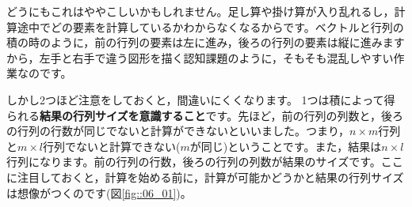 \documentclass{ltjsbook}
\begin{document}
どうにもこれはややこしいかもしれません。足し算や掛け算が入り乱れるし，計算途中でどの要素を計算しているかわからなくなるからです。ベクトルと行列の積の時のように，前の行列の要素は左に進み，後ろの行列の要素は縦に進みますから，左手と右手で違う図形を描く認知課題のように，そもそも混乱しやすい作業なのです。

しかし2つほど注意をしておくと，間違いにくくなります。
1つは積によって得られる\textbf{結果の行列サイズを意識すること}です。先ほど，前の行列の列数と，後ろの行列の行数が同じでないと計算ができないといいました。つまり，$n \times m$行列と$m \times l$行列でないと計算できない($m$が同じ)ということです。また，結果は$n \times l$行列になります。前の行列の行数，後ろの行列の列数が結果のサイズです。ここに注目しておくと，計算を始める前に，計算が可能かどうかと結果の行列サイズは想像がつくのです(図\ref{fig::06_01})。
\end{document}
